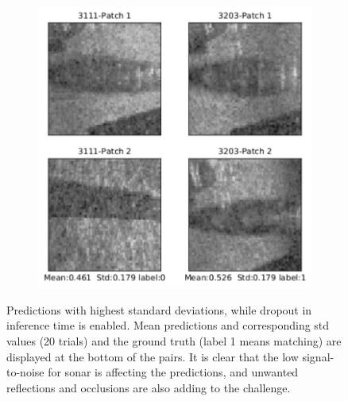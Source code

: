 \begin{figure}[ht]
\begin{subfigure}[b]{4.2cm}
    \label{fig:prediction_images_highest_stds_2}
  \end{subfigure}  
  ~
  \begin{subfigure}[b]{4.2cm}
    \includegraphics[width=\textwidth]{images/densenet/prediction_images_highest_stds_3_grey}
    \label{fig:prediction_images_highest_stds_3}
  \end{subfigure} 
  \caption[MC. predictions with highest std.]{Predictions with highest standard deviations, while dropout in inference time is enabled. Mean predictions and corresponding std values (20 trials) and the ground truth (label 1 means matching)
  are displayed at the bottom of the pairs.
  It is clear that the low signal-to-noise for sonar is affecting the predictions, and unwanted reflections and occlusions are also adding to the challenge.}
  \label{fig:mc_prediction_highest_std}
\end{figure}

